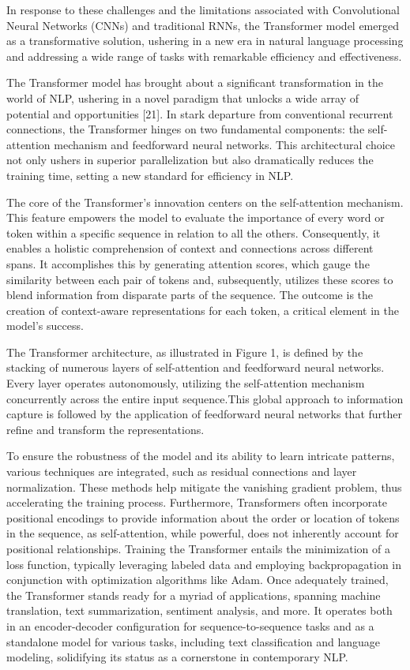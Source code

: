 \documentclass[conference]{IEEEtran}
\begin{document}
In response to these challenges and the limitations associated with Convolutional Neural Networks (CNNs) and traditional RNNs, the Transformer model emerged as a transformative solution, ushering in a new era in natural language processing and addressing a wide range of tasks with remarkable efficiency and effectiveness.

The Transformer model has brought about a significant transformation in the world of NLP, ushering in a novel paradigm that unlocks a wide array of potential and opportunities [21]. In stark departure from conventional recurrent connections, the Transformer hinges on two fundamental components: the self-attention mechanism and feedforward neural networks. This architectural choice not only ushers in superior parallelization but also dramatically reduces the training time, setting a new standard for efficiency in NLP.


The core of the Transformer's innovation centers on the self-attention mechanism. This feature empowers the model to evaluate the importance of every word or token within a specific sequence in relation to all the others. Consequently, it enables a holistic comprehension of context and connections across different spans. It accomplishes this by generating attention scores, which gauge the similarity between each pair of tokens and, subsequently, utilizes these scores to blend information from disparate parts of the sequence. The outcome is the creation of context-aware representations for each token, a critical element in the model's success.


The Transformer architecture, as illustrated in Figure 1, is defined by the stacking of numerous layers of self-attention and feedforward neural networks. Every layer operates autonomously, utilizing the self-attention mechanism concurrently across the entire input sequence.This global approach to information capture is followed by the application of feedforward neural networks that further refine and transform the representations.


To ensure the robustness of the model and its ability to learn intricate patterns, various techniques are integrated, such as residual connections and layer normalization. These methods help mitigate the vanishing gradient problem, thus accelerating the training process. Furthermore, Transformers often incorporate positional encodings to provide information about the order or location of tokens in the sequence, as self-attention, while powerful, does not inherently account for positional relationships.
Training the Transformer entails the minimization of a loss function, typically leveraging labeled data and employing backpropagation in conjunction with optimization algorithms like Adam. Once adequately trained, the Transformer stands ready for a myriad of applications, spanning machine translation, text summarization, sentiment analysis, and more. It operates both in an encoder-decoder configuration for sequence-to-sequence tasks and as a standalone model for various tasks, including text classification and language modeling, solidifying its status as a cornerstone in contemporary NLP.
\end{document}
